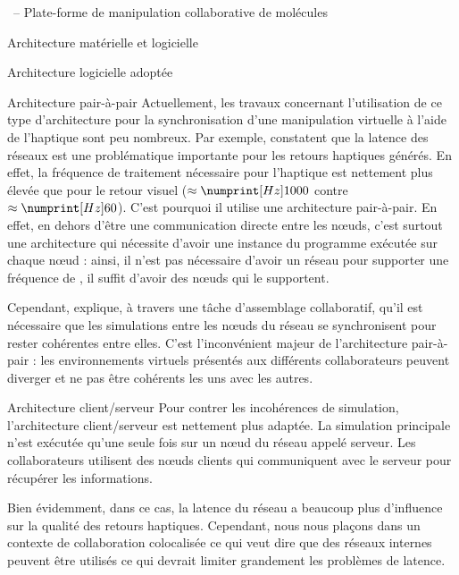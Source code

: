 \documentclass[myfrancais,ngerman,english,frenchb]{mythesis}
\begin{document}
\begin{mychapter}{\myShaddock\ -- Plate-forme de manipulation collaborative de molécules}
\begin{mysection}{Architecture matérielle et logicielle}
\begin{mysubsection}{Architecture logicielle adoptée}
\begin{mysubsubsection}{Architecture pair-à-pair}
					Actuellement, les travaux concernant l'utilisation de ce type d'architecture pour la synchronisation d'une manipulation virtuelle à l'aide de l'haptique sont peu nombreux.
					Par exemple,  constatent que la latence des réseaux est une problématique importante pour les retours haptiques générés.
					En effet, la fréquence de traitement nécessaire pour l'haptique est nettement plus élevée que pour le retour visuel ($\approx \mynum[Hz]{1000}$ contre $\approx \mynum[Hz]{60}$).
					C'est pourquoi il utilise une architecture pair-à-pair.
					En effet, en dehors d'être une communication directe entre les nœuds, c'est surtout une architecture qui nécessite d'avoir une instance du programme exécutée sur chaque nœud : ainsi, il n'est pas nécessaire d'avoir un réseau pour supporter une fréquence de , il suffit d'avoir des nœuds qui le supportent.

					Cependant,  explique, à travers une tâche d'assemblage collaboratif, qu'il est nécessaire que les simulations entre les nœuds du réseau se synchronisent pour rester cohérentes entre elles.
					C'est l'inconvénient majeur de l'architecture pair-à-pair : les environnements virtuels présentés aux différents collaborateurs peuvent diverger et ne pas être cohérents les uns avec les autres.
				\end{mysubsubsection}
				\begin{mysubsubsection}{Architecture client/serveur}
					Pour contrer les incohérences de simulation, l'architecture client/serveur est nettement plus adaptée.
					La simulation principale n'est exécutée qu'une seule fois sur un nœud du réseau appelé serveur.
					Les collaborateurs utilisent des nœuds clients qui communiquent avec le serveur pour récupérer les informations.

					Bien évidemment, dans ce cas, la latence du réseau a beaucoup plus d'influence sur la qualité des retours haptiques.
					Cependant, nous nous plaçons dans un contexte de collaboration colocalisée ce qui veut dire que des réseaux internes peuvent être utilisés ce qui devrait limiter grandement les problèmes de latence.


\end{mysubsubsection}
\end{mysubsection}
\end{mysection}
\end{mychapter}
\end{document}
